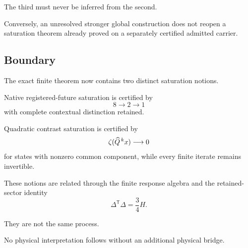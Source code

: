 The third must never be inferred from the second.

Conversely, an unresolved stronger global construction does not reopen
a saturation theorem already proved on a separately certified admitted
carrier.

\subsection{Boundary}

The exact finite theorem now contains two distinct saturation notions.

Native registered-future saturation is certified by
\[
8\longrightarrow2\longrightarrow1
\]
with complete contextual distinction retained.

Quadratic contrast saturation is certified by
\[
\zeta(\widehat Q^{\,k}x)\longrightarrow0
\]
for states with nonzero common component, while every finite iterate
remains invertible.

These notions are related through the finite response algebra and the
retained-sector identity
\[
\Delta^{\mathsf T}\Delta=\frac34H.
\]

They are not the same process.

No physical interpretation follows without an additional physical
bridge.
